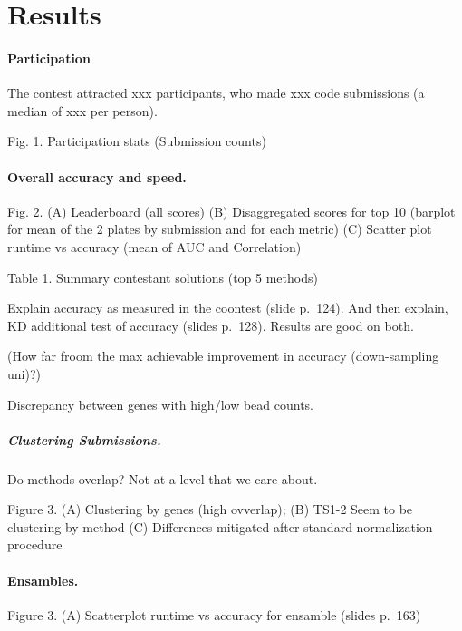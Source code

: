 \documentclass[]{article}
\let\oldparagraph\paragraph
\renewcommand{\paragraph}[1]{\oldparagraph{#1}\mbox{}}
\let\oldsubparagraph\subparagraph
\renewcommand{\subparagraph}[1]{\oldsubparagraph{#1}\mbox{}}
\begin{document}
\hypertarget{results}{%
\section{Results}\label{results}}

\hypertarget{participation}{%
\paragraph{Participation}\label{participation}}

The contest attracted xxx participants, who made xxx code submissions (a
median of xxx per person).

Fig. 1. Participation stats (Submission counts)

\hypertarget{overall-accuracy-and-speed.}{%
\paragraph{Overall accuracy and
speed.}\label{overall-accuracy-and-speed.}}

Fig. 2. (A) Leaderboard (all scores) (B) Disaggregated scores for top 10
(barplot for mean of the 2 plates by submission and for each metric) (C)
Scatter plot runtime vs accuracy (mean of AUC and Correlation)

Table 1. Summary contestant solutions (top 5 methods)

Explain accuracy as measured in the coontest (slide p.~124). And then
explain, KD additional test of accuracy (slides p.~128). Results are
good on both.

(How far froom the max achievable improvement in accuracy (down-sampling
uni)?)

Discrepancy between genes with high/low bead counts.

\hypertarget{clustering-submissions.}{%
\subparagraph{Clustering Submissions.}\label{clustering-submissions.}}

Do methods overlap? Not at a level that we care about.

Figure 3. (A) Clustering by genes (high ovverlap); (B) TS1-2 Seem to be
clustering by method (C) Differences mitigated after standard
normalization procedure

\hypertarget{ensambles.}{%
\paragraph{Ensambles.}\label{ensambles.}}

Figure 3. (A) Scatterplot runtime vs accuracy for ensamble (slides
p.~163)
\end{document}
